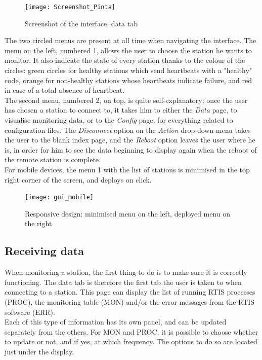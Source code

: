 \documentclass{themeensg}
\begin{document}
\begin{figure}[ht]
	\centering
	\texttt{[image: Screenshot\_Pinta]}
	\caption{Screenshot of the interface, data tab}
\end{figure}

The two circled menus are present at all time when navigating the interface. The menu on the left, numbered 1, allows the user to choose the station he wants to monitor. It also indicate the state of every station thanks to the colour of the circles: green circles for healthy stations which send heartbeats with a "healthy" code, orange for non-healthy  stations whose heartbeats indicate failure, and red in case of a total absence of heartbeat.\\

The second menu, numbered 2, on top, is quite self-explanatory; once the user has chosen a station to connect to, it takes him to either the \textit{Data} page, to visualise monitoring data, or to the \textit{Config} page, for everything related to configuration files. The \textit{Disconnect} option on the \textit{Action} drop-down menu takes the user to the blank index page, and the \textit{Reboot} option leaves the user where he is, in order for him to see the data beginning to display again when the reboot of the remote station is complete.\\

For mobile devices, the menu 1 with the list of stations is minimised in the top right corner of the screen, and deploys on click.\\

\begin{figure}[ht]
	\centering
	\texttt{[image: gui\_mobile]}
	\caption{Responsive design: minimised menu on the left, deployed menu on the right}
\end{figure}


\subsection{Receiving data}

When monitoring a station, the first thing to do is to make sure it is correctly functioning. The data tab is therefore the first tab the user is taken to when connecting to a station. This page can display the list of running RTIS processes (PROC), the monitoring table (MON) and/or the error messages from the RTIS software (ERR).\\

Each of this type of information has its own panel, and can be updated separately from the others. For MON and PROC, it is possible to choose whether to update or not, and if yes, at which frequency. The options to do so are located just under the display.\\
\end{document}

